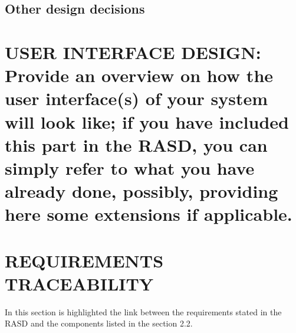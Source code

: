 \documentclass[12pt,a4paper]{article}
\begin{document}
\subsection{Other design decisions}
\section{USER INTERFACE DESIGN: Provide an overview on how the user interface(s) of your system will look like; if you have included this part in the RASD, you can simply refer to what you have already done, possibly, providing here some extensions if applicable.}
\section{REQUIREMENTS TRACEABILITY}
In this section is highlighted the link between the requirements stated in the RASD and the components listed in the section 2.2.\\\\
\end{document}
